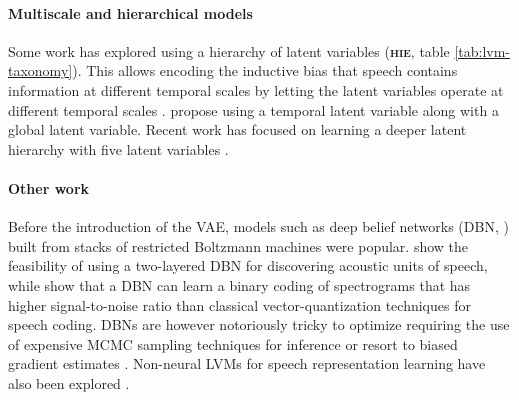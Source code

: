 \paragraph{Multiscale and hierarchical models} Some work has explored using a hierarchy of latent variables (\textbf{\textsc{hie}}, table \ref{tab:lvm-taxonomy}). This allows encoding the inductive bias that speech contains information at different temporal scales by letting the latent variables operate at different temporal scales \cite{hsu_unsupervised_2017}. \citet{khurana_factorial_2019} propose using a temporal latent variable along with a global latent variable. 
Recent work has focused on learning a deeper latent hierarchy with five latent variables \cite{aksan_stcn_2019}. 


\paragraph{Other work}
Before the introduction of the VAE, models such as deep belief networks (DBN, \citealp{hinton_fast_2006}) built from stacks of restricted Boltzmann machines \cite{smolensky_parallel_1987,fischer:13} were popular. \citet{lee_unsupervised_2009} show the feasibility of using a two-layered DBN for discovering acoustic units of speech, while \citet{deng_binary_2010} show that a DBN can learn a binary coding of spectrograms that has higher signal-to-noise ratio than classical vector-quantization techniques for speech coding.
DBNs are however notoriously tricky to optimize requiring the use of expensive MCMC sampling techniques for inference or resort to biased gradient estimates \cite{hinton_practical_2012,fischer:10c}.
Non-neural LVMs for speech representation learning have also been explored
\cite{lee_nonparametric_2012, ondel_variational_2016, heck_feature_2017, jansen_weak_2013}.




